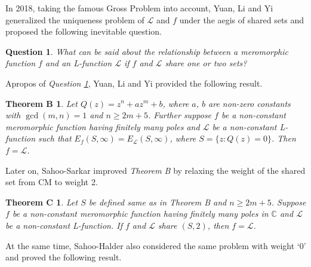 \documentclass[a4paper,draft]{amsproc}
\theoremstyle{plain}
\newtheorem*{theoB}{Theorem B}
\newtheorem*{theoC}{Theorem C}
\newtheorem{ques}{Question}[section]
\theoremstyle{definition}
\theoremstyle{remark}
\newtheorem{rem}{Remark}[section]
\numberwithin{equation}{section}
\begin{document}
In 2018, taking the famous Gross Problem \cite{fg} into account,
Yuan, Li and Yi \cite{yuan2018} generalized the uniqueness problem of $\mathcal{L}$ and $f$ under the aegis of shared sets and   proposed the following inevitable question.
\begin{ques}\label{q1}\cite{yuan2018}
What can be said about the relationship between a meromorphic function $f$ and an L-function $\mathcal{L}$ if $f$ and $\mathcal{L}$ share one or two sets?
\end{ques}
Apropos of {\em Question \ref{q1}}, Yuan, Li and Yi provided the following result.
\begin{theoB}\cite{yuan2018}
Let $Q(z) = z^n + az^m + b$, where $a$, $b$ are non-zero constants with $\gcd(m,n)=1$ and $n \geq 2m + 5$. Further suppose  $f$ be a non-constant meromorphic function having finitely many poles and $\mathcal{L}$
be a non-constant L-function such that $E_{f}(S,\infty)=E_{\mathcal{L}}(S,\infty)$, where $S=\{z:Q(z)=0\}$. Then $f = \mathcal{L}$.
\end{theoB}
Later on,  Sahoo-Sarkar \cite{ss} improved  {\em Theorem B} by relaxing the weight  of the shared set from CM to weight 2.
\begin{theoC}\cite{ss}
Let $S$ be defined same as in {\em Theorem B} and $n \geq 2m+5$. Suppose $f$ be a non-constant meromorphic
function having finitely many poles in $\mathbb{C}$ and  $\mathcal{L}$ be a non-constant L-function. If $f$ and $\mathcal{L}$
share $(S, 2)$, then $f = \mathcal{L}$.
\end{theoC}
At the same time, Sahoo-Halder also considered the same problem with weight `$0$' and proved the following result. 
\end{document}
